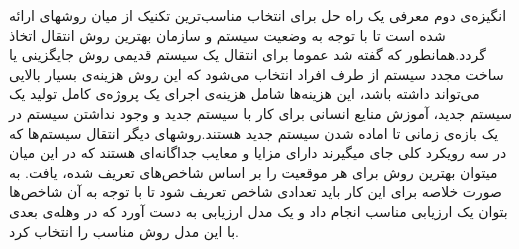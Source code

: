 انگیزه‌ی دوم معرفی یک راه حل برای انتخاب مناسب‌ترین تکنیک از میان روشهای ارائه شده است  تا با توجه به وضعیت سیستم  و سازمان بهترین روش انتقال اتخاذ گردد.همانطور که گفته شد عموما برای انتقال یک سیستم قدیمی روش جایگزینی یا ساخت مجدد سیستم از طرف افراد انتخاب می‌شود که این روش هزینه‌ی بسیار بالایی می‌تواند داشته باشد،‌ این هزینه‌ها شامل هزینه‌ی اجرای یک پروژه‌ی کامل تولید یک سیستم جدید، آموزش منایع انسانی برای کار با سیستم جدید و وجود نداشتن سیستم در یک بازه‌ی زمانی تا اماده شدن سیستم جدید هستند.روشهای دیگر انتقال سیستم‌ها که در سه رویکرد کلی جای میگیرند دارای مزایا و معایب جداگانه‌ای هستند که در این میان میتوان بهترین روش برای هر موقعیت را بر اساس شاخص‌های تعریف شده، یافت. به صورت خلاصه برای این کار باید تعدادی شاخص تعریف شود تا با توجه به آن شاخص‌ها بتوان یک ارزیابی مناسب انجام داد و یک مدل ارزیابی به دست آورد که در وهله‌ی  بعدی با این مدل روش مناسب را انتخاب کرد. 

